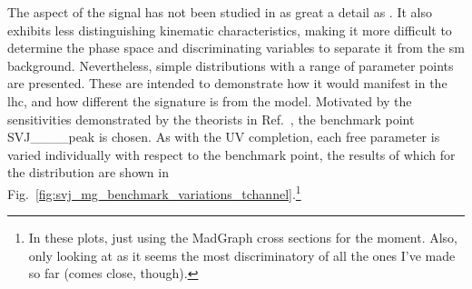 
The \tchannel aspect of the signal has not been studied in as great a detail as \schannel. It also exhibits less distinguishing kinematic characteristics, making it more difficult to determine the phase space and discriminating variables to separate it from the \acrlong{sm} background. Nevertheless, simple distributions with a range of parameter points are presented. These are intended to demonstrate how it would manifest in the \acrshort{lhc}, and how different the signature is from the \schannel model. Motivated by the sensitivities demonstrated by the theorists in Ref.~, the benchmark point SVJ\_\_\_\_\-peak is chosen. As with the \schannel UV completion, each free parameter is varied individually with respect to the benchmark point, the results of which for the \mT distribution are shown in Fig.~\ref{fig:svj_mg_benchmark_variations_tchannel}.\footnote{In these plots, just using the MadGraph cross sections for the moment. Also, only looking at \mT as it seems the most discriminatory of all the ones I've made so far (\ptmiss comes close, though).}

